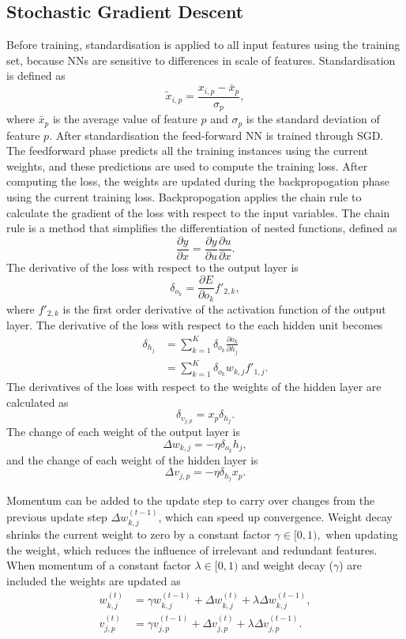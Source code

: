 \documentclass[conference]{IEEEtran}
\begin{document}
	\subsection{Stochastic Gradient Descent}
	\label{met:sgd}
	Before training, standardisation is applied to all input features using the training set, because NNs are sensitive to differences in scale of features. Standardisation is defined as 
	\[\tilde{x}_{i, p} = \frac{x_{i, p} - \bar{x}_p}{\sigma_p},\]
	where $\bar{x}_p$ is the average value of feature $p$ and $\sigma_p$ is the standard deviation of feature $p$. After standardisation the feed-forward NN is trained through SGD. The feedforward phase predicts all the training instances using the current weights, and these predictions are used to compute the training loss. After computing the loss, the weights are updated during the backpropogation phase using the current training loss. Backpropogation applies the chain rule to calculate the gradient of the loss with respect to the input variables. The chain rule is a method that simplifies the differentiation of nested functions, defined as
	\[\frac{\partial y}{\partial x} = \frac{\partial y}{\partial u} \frac{\partial u}{\partial x}.\]  The derivative of the loss with respect to the output layer is
	\[\delta_{o_k} = \frac{\partial E}{\partial o_k} f'_{2, k},\]
	where $f'_{2, k}$ is the first order derivative of the activation function of the output layer. The derivative of the loss with respect to the each hidden unit becomes
	\begin{align}
		\delta_{h_j}
		&= \sum_{k=1}^{K} \delta_{o_k}
		\frac{\partial o_k}{\partial h_j} \\
		&= \sum_{k=1}^{K} \delta_{o_k}
		w_{k,j} f'_{1,j}.
	\end{align}
	The derivatives of the loss with respect to the weights of the hidden layer are calculated as
	\[\delta_{v_{j, p}} = x_p \delta_{h_j}.\]
	The change of each weight of the output layer is 
	\[\Delta w_{k, j} = -\eta \delta_{o_k} h_j,\]
	and the change of each weight of the hidden layer is 
	\[\Delta v_{j, p} = -\eta \delta_{h_j} x_p.\]
	
	Momentum can be added to the update step to carry over changes from the previous update step $\Delta w_{k, j}^{(t-1)}$, which can speed up convergence. Weight decay shrinks the current weight to zero by a constant factor $\gamma \in [0, 1),$ when updating the weight, which reduces the influence of irrelevant and redundant features. When momentum of a constant factor $\lambda \in [0, 1)$ and weight decay ($\gamma$) are included the weights are updated as
	\begin{align}
		w_{k,j}^{(t)}
		&= \gamma w_{k,j}^{(t-1)}
		+ \Delta w_{k,j}^{(t)}
		+ \lambda \Delta w_{k,j}^{(t-1)}, \\
		v_{j,p}^{(t)}
		&= \gamma v_{j,p}^{(t-1)}
		+ \Delta v_{j,p}^{(t)}
		+ \lambda \Delta v_{j,p}^{(t-1)}.
	\end{align}
	
\end{document}
